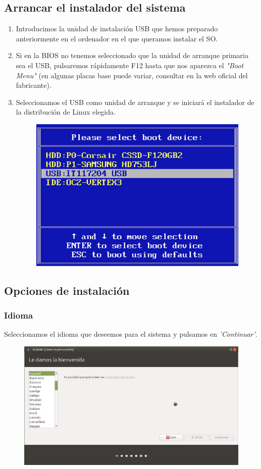 \subsection{Arrancar el instalador del sistema}
\begin{enumerate}
    \item Introducimos la unidad de instalación USB que hemos preparado anteriormente en el ordenador en el que queramos instalar el SO.
    \item Si en la BIOS no tenemos seleccionado que la unidad de arranque primaria sea el USB, pulsaremos rápidamente F12 hasta que nos aparezca el \textit{"Boot Menu"} (en algunas placas base puede variar, consultar en la web oficial del fabricante).
    \item Seleccionamos el USB como unidad de arranque y se iniciará el instalador de la distribución de Linux elegida.
    \begin{figure}[H]
        \centering
        \includegraphics[width= 0.5 \textwidth]{Media/boot-menu-formatear-pc.jpg}
    \end{figure}
\end{enumerate}

\subsection{Opciones de instalación}
    \subsubsection{Idioma} 
    Seleccionamos el idioma que deseemos para el sistema y pulsamos en \textit{'Continuar'}.
     \begin{figure}[H]
        \centering
        \includegraphics[width= 0.7 \textwidth]{Media/umate1.png}
    \end{figure}
